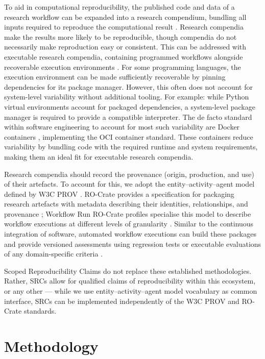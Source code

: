\documentclass[conference,a4paper]{IEEEtran}
\begin{document}
  To aid in computational reproducibility, the published code and data of a research workflow can be expanded into a research compendium, bundling all inputs required to reproduce the computational result \cite{gentleman2007}. Research compendia make the results more likely to be reproducible, though compendia do not necessarily make reproduction easy or consistent. This can be addressed with executable research compendia, containing programmed workflows alongside recoverable execution environments \cite{nuest2017}. For some programming languages, the execution environment can be made sufficiently recoverable by pinning dependencies for its package manager. However, this often does not account for system-level variability without additional tooling. For example: while Python virtual environments account for packaged dependencies, a system-level package manager is required to provide a compatible interpreter. The de facto standard within software engineering to account for most such variability are Docker containers \cite{boettiger2015docker}, implementing the OCI container standard. These containers reduce variability by bundling code with the required runtime and system requirements, making them an ideal fit for executable research compendia.


  Research compendia should record the provenance (origin, production, and use) of their artefacts. To account for this, we adopt the entity--activity--agent model defined by W3C PROV \cite{w3cprovdm}. RO-Crate provides a specification for packaging research artefacts with metadata describing their identities, relationships, and provenance \cite{soilandreyes2022}; Workflow Run RO-Crate profiles specialise this model to describe workflow executions at different levels of granularity \cite{leo2024}. Similar to the continuous integration of software, automated workflow executions can build these packages and provide versioned assessments using regression tests or executable evaluations of any domain-specific criteria \cite{sandve2013,wilson2014}.

  Scoped Reproducibility Claims do not replace these established methodologies. Rather, SRCs allow for qualified claims of reproducibility within this ecosystem, or any other --- while we use entity--activity--agent model vocabulary as common interface, SRCs can be implemented independently of the W3C PROV and RO-Crate standards.

\section{Methodology}
\end{document}
